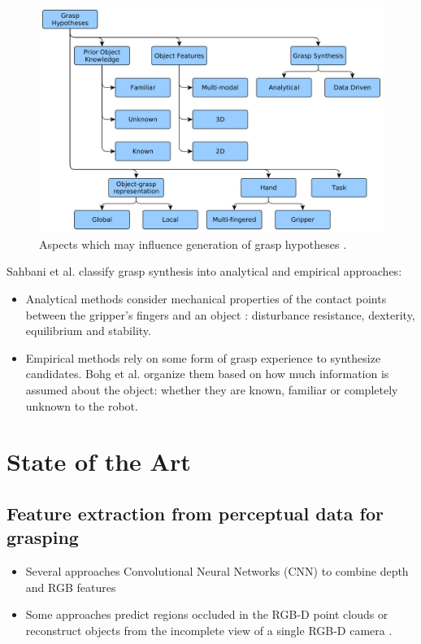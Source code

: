 \documentclass[runningheads]{../llncs}
\begin{document}
\begin{figure}[h!]
    \centering
    \includegraphics[width=\textwidth]{bohg14-grasp_synthesis_mind_map}
    \caption{Aspects which may influence generation of grasp hypotheses \cite{Bohg2014}.}
    \label{fig:grasp_synthesis_mind_map}
\end{figure}

Sahbani et al. \cite{Sahbani2012} classify grasp synthesis into analytical and empirical approaches:

\begin{itemize}
    \item Analytical methods consider mechanical properties of the contact points between the gripper's fingers and an
    object \cite{Roa2015,Sahbani2012,Shimoga1996}: disturbance resistance, dexterity, equilibrium and stability.
    \item Empirical methods rely on some form
of grasp experience to synthesize candidates. Bohg et al. \cite{Bohg2014}
    organize them based on how much information is assumed about the object: whether they are known, familiar or
    completely unknown to the robot.
\end{itemize}

\section{State of the Art}

\subsection{Feature extraction from perceptual data for grasping}

\begin{itemize}
    \item Several approaches Convolutional Neural Networks (CNN) to combine depth and RGB features
            \cite{Eitel2015,Gupta2014RGBDFeatures,Porzi2017}
    \item Some approaches predict regions occluded in the RGB-D point clouds \cite{Qi2016,Su2015} or reconstruct objects
            from the incomplete view of a single RGB-D camera \cite{Bohg2011MindTheGap,Varley2017}.
\end{itemize}
\end{document}
